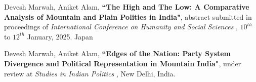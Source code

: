 
\begin{enumerate}[label={[P\arabic*]}]  
    \item Devesh Marwah, Aniket Alam, \textbf{``The High and The Low: A Comparative Analysis of Mountain and Plain Polities in India"}, abstract submitted in proceedings of {\it International Conference on Humanity and Social Sciences }  , $10^{th}$ to $12^{th}$ January, 2025. Japan
    
    
    \item Devesh Marwah, Aniket Alam, \textbf{``Edges of the Nation: Party System Divergence and Political Representation in Mountain India"}, under review at {\it Studies in Indian Politics }, New Delhi, India. 
    
\end{enumerate}
